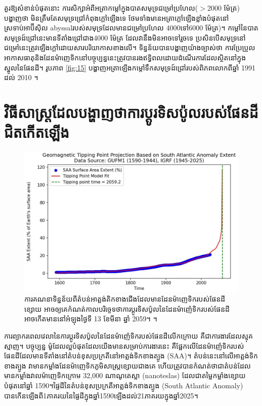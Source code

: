 \documentclass[10pt,twocolumn,letterpaper]{article}
\begin{document}
គួរឱ្យសំខាន់បំផុតនោះ ការសិក្សាអំពីអត្រាកម្តៅក្នុងបាតសមុទ្រជម្រៅប្រហែល($>$2000 ម៉ែត្រ) បង្ហាញថា មិនត្រឹមតែសមុទ្រជ្រៅកំពុងក្ដៅឡើងទេ ថែមទាំងមានអត្រាក្ដៅឡើងខ្លាំងបំផុតនៅស្រទាប់អាប៊ីស៊ិល abyssalរបស់សមុទ្រដែលមានជម្រៅប្រហែល 4000ទៅ6000 ម៉ែត្រ)។ កម្តៅនៃបាតសមុទ្រដ៍ជ្រៅនេះមានទីតាំងជ្រៅជាង4000 ម៉ែត្រ \cite{132,129} ដែលវានឹងមិនអាចទៅរួចទេ ប្រសិនបើសមុទ្រនៅជម្រៅនេះត្រូវឡើងក្តៅដោយសារបរិយាកាសខាងលើ។ ទិន្នន័យបានបង្ហាញយ៉ាងច្បាស់ថា ការប្រែប្រួលអាកាសធាតុនិងដែនម៉ាញេទិកនៅបច្ចុប្បន្ននេះត្រូវបានរងឥទ្ធិពលដោយដំណើរការដែលស្ថិតនៅក្នុងស្នូលនៃផែនដី។ រូបភាព \ref{fig:15} បង្ហាញអត្រាឡើងកម្ដៅទឹកសមុទ្រដ៍ជ្រៅរបស់ពិភពលោកពីឆ្នាំ 1991 ដល់ 2010 \cite{132}។

\section{វិធីសាស្ត្រដែលបង្ហាញថាការប្តូរទិសប៉ូលរបស់ផែនដីជិតកើតឡើង}

\begin{figure}[b]
\begin{center}
   \includegraphics[width=1\linewidth]{saa-crop.jpeg}
\end{center}
   \caption{ការគណនាទិន្នន័យពីតំបន់អាត្លង់តិកខាងជើងដែលមានដែនម៉ាញេទិករបស់ផែនដីខ្សោយ អាចឲ្យគេកំណត់កាលបរិច្ចេទថាការប្តូរទិសប៉ូលនៃដែនម៉ាញ៉េទិករបស់ផែនដីអាចកើតមាននៅអំឡុងថ្ងៃទី 13 ខែមីនា ឆ្នាំ 2059។ \cite{125,126}។}
\label{fig:16}
\label{fig:onecol}
\end{figure}

ការព្យាករពេលវេលានៃការប្តូរទិសប៉ូលនៃដែនម៉ាញ៉េទិករបស់ផែនដីលើកក្រោយ គឺជាការងារដែលស្មុគស្មាញ។ បច្ចុប្បន្ន ម៉ូដែលល្អបំផុតដែលយើងមានសម្រាប់ការងារនេះ គឺផ្អែកលើដែនម៉ាញ៉េទិករបស់ផែនដីដែលមានទីតាំងនៅតំបន់ខុសប្រក្រតីនៅអាត្លង់ទិកខាងត្បូង (SAA)។ តំបន់នេះនៅលើអាត្លង់ទិកខាងត្បូង វាមានកម្លាំងដែនម៉ាញេទិកភូមិសាស្ត្រខ្សោយជាងគេ ហើយត្រូវបានកំណត់ថាជាតំបន់ដែលមានកម្លាំងវាលម៉ាញេទិកក្រោម 32,000 ណាណូតេស្លា (nanoteslas)\cite{135} ដែលជាតម្លៃកម្លាំងខ្សោយបំផុតនៅឆ្នាំ 1590។​ផ្ទៃដីនៃតំបន់ខុសប្រក្រតីអាត្លង់ទិកខាងត្បូង (South Atlantic Anomaly) បានកើនឡើងពី1ភាគរយនៃផ្ទៃដីក្នុងឆ្នាំ​1590​ឡើងដល់21ភាគរយក្នុងឆ្នាំ2025\cite{136}។
\end{document}
